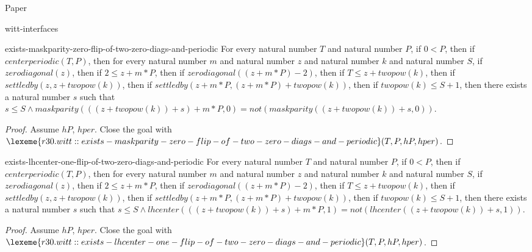 \begin{lexlean}{Paper}
\begin{section}{witt-interfaces}
  \begin{theorem}{exists-maskparity-zero-flip-of-two-zero-diags-and-periodic}
  For every natural number \(T\) and natural number \(P\), if \(0 < P\), then if \(centerperiodic(T, P)\), then for every natural number \(m\) and natural number \(z\) and natural number \(k\) and natural number \(S\), if \(zerodiagonal(z)\), then if \(2 ≤ z + m * P\), then if \(zerodiagonal((z + m * P) - 2)\), then if \(T ≤ z + twopow(k)\), then if \(settledby(z, z + twopow(k))\), then if \(settledby(z + m * P, (z + m * P) + twopow(k))\), then if \(twopow(k) ≤ S + 1\), then there exists a natural number \(s\) such that \(s ≤ S ∧ maskparity(((z + twopow(k)) + s) + m * P, 0) = not(maskparity((z + twopow(k)) + s, 0))\).
  \begin{proof}
  Assume \(hP\), \(hper\).
  Close the goal with \(\lexeme{r30.witt::exists-maskparity-zero-flip-of-two-zero-diags-and-periodic}(T, P, hP, hper)\).
  \end{proof}
  \end{theorem}

  \begin{theorem}{exists-lhcenter-one-flip-of-two-zero-diags-and-periodic}
  For every natural number \(T\) and natural number \(P\), if \(0 < P\), then if \(centerperiodic(T, P)\), then for every natural number \(m\) and natural number \(z\) and natural number \(k\) and natural number \(S\), if \(zerodiagonal(z)\), then if \(2 ≤ z + m * P\), then if \(zerodiagonal((z + m * P) - 2)\), then if \(T ≤ z + twopow(k)\), then if \(settledby(z, z + twopow(k))\), then if \(settledby(z + m * P, (z + m * P) + twopow(k))\), then if \(twopow(k) ≤ S + 1\), then there exists a natural number \(s\) such that \(s ≤ S ∧ lhcenter(((z + twopow(k)) + s) + m * P, 1) = not(lhcenter((z + twopow(k)) + s, 1))\).
  \begin{proof}
  Assume \(hP\), \(hper\).
  Close the goal with \(\lexeme{r30.witt::exists-lhcenter-one-flip-of-two-zero-diags-and-periodic}(T, P, hP, hper)\).
  \end{proof}
  \end{theorem}


\end{section}
\end{lexlean}
